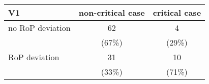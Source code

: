 \begin{table}[ht]
\centering
\begin{tabular}{l|cc}
  \hline
V1 & non-critical case & critical case \\ 
  \hline
no RoP deviation & 62 & 4 \\ 
   & (67\%) & (29\%) \\ 
  RoP deviation & 31 & 10 \\ 
   & (33\%) & (71\%) \\ 
   \hline
\end{tabular}
\end{table}
